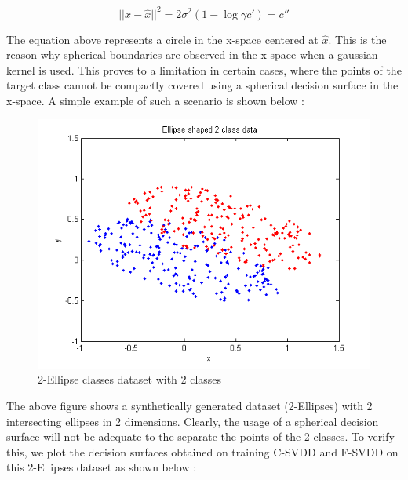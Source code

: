 \documentclass{article} %
\begin{document}
\[ || x - \hat{x}||^2 = 2 \sigma^2 (1 - \log{\gamma c'}) = c''\] 

The equation above represents a circle in the x-space centered at $\hat{x}$. This is the reason why spherical boundaries are observed in the x-space when a gaussian kernel is used. This proves to a limitation in certain cases, where the points of the target class cannot be compactly covered using a spherical decision surface in the x-space. A simple example of such a scenario is shown below :


\begin{figure}[H]
  \centering
  \includegraphics[width=\linewidth]{Plots/Ellipse/svdd/data}
  \caption{2-Ellipse classes dataset with 2 classes}
\end{figure}



The above figure shows a synthetically generated dataset (2-Ellipses) with 2 intersecting ellipses in 2 dimensions.  Clearly, the usage of a spherical decision surface will not be adequate to the separate the points of the 2 classes. To verify this, we plot the decision surfaces obtained on training C-SVDD and F-SVDD on this 2-Ellipses dataset as shown below :
\end{document}
